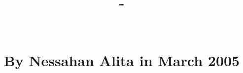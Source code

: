 \documentclass[a4paper, 12pt]{article}
\title{%
	\Large \textbf{\textsc{\bookseries \space - \bookvolume}} \\
	\hfill \break%
	\huge \textbf{\booktitle} \\
	\hfill \break%
	\large \textbf{\booksubtitle} \\
	\hfill \break%
	\hfill \break%
	\hfill \break%
	\small \textbf{By Nessahan Alita in March 2005} \\
	\hfill \break%
	\hfill \break%
	\hfill \break%
	\citationdata \\
	\hfill \break%
	\summary \\
	\hfill \break%
	\keywords%
}
\date{}
\author{}
\begin{document}
\maketitle

\justifying



\normalsize
\tableofcontents








\end{document}
